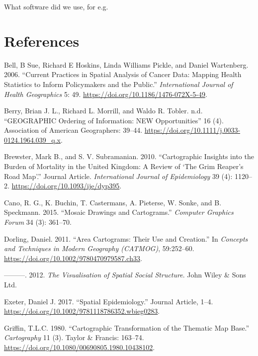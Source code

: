 \documentclass[11pt,]{article}
\begin{document}
What software did we use, for e.g.

\hypertarget{references}{%
\section{References}\label{references}}

\hypertarget{refs}{}
\leavevmode\hypertarget{ref-CPISACA}{}%
Bell, B Sue, Richard E Hoskins, Linda Williams Pickle, and Daniel
Wartenberg. 2006. ``Current Practices in Spatial Analysis of Cancer
Data: Mapping Health Statistics to Inform Policymakers and the Public.''
\emph{International Journal of Health Geographics} 5: 49.
\url{https://doi.org/10.1186/1476-072X-5-49}.

\leavevmode\hypertarget{ref-GOINO}{}%
Berry, Brian J. L., Richard L. Morrill, and Waldo R. Tobler. n.d.
``GEOGRAPHIC Ordering of Information: NEW Opportunities'' 16 (4).
Association of American Geographers: 39--44.
\url{https://doi.org/10.1111/j.0033-0124.1964.039_q.x}.

\leavevmode\hypertarget{ref-CIBMUK}{}%
Brewster, Mark B., and S. V. Subramanian. 2010. ``Cartographic Insights
into the Burden of Mortality in the United Kingdom: A Review of `The
Grim Reaper's Road Map'.'' Journal Article. \emph{International Journal
of Epidemiology} 39 (4): 1120--2.
\url{https://doi.org/10.1093/ije/dyp395}.

\leavevmode\hypertarget{ref-MDAC}{}%
Cano, R. G., K. Buchin, T. Castermans, A. Pieterse, W. Sonke, and B.
Speckmann. 2015. ``Mosaic Drawings and Cartograms.'' \emph{Computer
Graphics Forum} 34 (3): 361--70.

\leavevmode\hypertarget{ref-ACTUC}{}%
Dorling, Daniel. 2011. ``Area Cartograms: Their Use and Creation.'' In
\emph{Concepts and Techniques in Modern Geography (CATMOG)}, 59:252--60.
\url{https://doi.org/10.1002/9780470979587.ch33}.

\leavevmode\hypertarget{ref-TVSSS}{}%
---------. 2012. \emph{The Visualisation of Spatial Social Structure}.
John Wiley \& Sons Ltd.

\leavevmode\hypertarget{ref-SE}{}%
Exeter, Daniel J. 2017. ``Spatial Epidemiology.'' Journal Article, 1--4.
\url{https://doi.org/10.1002/9781118786352.wbieg0283}.

\leavevmode\hypertarget{ref-CTTMB}{}%
Griffin, T.L.C. 1980. ``Cartographic Transformation of the Thematic Map
Base.'' \emph{Cartography} 11 (3). Taylor \& Francis: 163--74.
\url{https://doi.org/10.1080/00690805.1980.10438102}.
\end{document}
